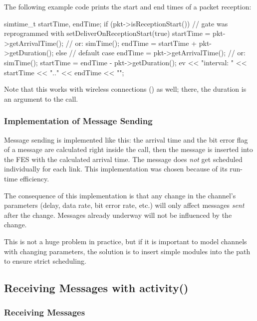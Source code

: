 The following example code prints the start and end times of a packet reception:

\begin{cpp}
simtime_t startTime, endTime;
if (pkt->isReceptionStart())
{
    // gate was reprogrammed with setDeliverOnReceptionStart(true)
    startTime = pkt->getArrivalTime(); // or: simTime();
    endTime = startTime + pkt->getDuration();
}
else
{
    // default case
    endTime = pkt->getArrivalTime(); // or: simTime();
    startTime = endTime - pkt->getDuration();
}
ev << "interval: " << startTime << ".." << endTime << "\n";
\end{cpp}

Note that this works with wireless connections ()
as well; there, the duration is an argument to the 
call.


\subsubsection{Implementation of Message Sending}

Message sending is implemented like this: the arrival time
and the bit error flag of a message are calculated right inside
the  call, then the message is inserted into the FES
with the calculated arrival time. The message does \textit{not} get scheduled
individually for each link. This implementation was chosen because of its
run-time efficiency.

\begin{note}
   The consequence of this implementation is that any change in the
   channel's parameters (delay, data rate, bit error rate, etc.) will only affect
   messages \textit{sent} after the change. Messages already underway will not
   be influenced by the change.

   This is not a huge problem in practice, but if it is important to model
   channels with changing parameters, the solution is to insert simple modules
   into the path to ensure strict scheduling.
\end{note}


\subsection{Receiving Messages with activity()}

\subsubsection{Receiving Messages}
\label{sec:simple-modules:receiving-messages}

